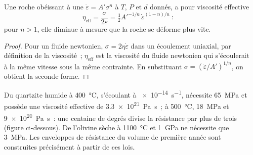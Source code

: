 \begin{proposition}\label{prop:b3:deformation-mechanisms:viscosity}
Une roche obéissant à une  $\dot\varepsilon = A'\sigma^n$ à $T$, $P$ et
$d$ donnés, a pour viscosité effective
\[
  \eta_{\mathrm{eff}} = \frac{\sigma}{2\dot\varepsilon}
  = \tfrac12A'^{-1/n}\,\dot\varepsilon^{(1-n)/n}~:
\]
pour $n > 1$, elle diminue à mesure que la roche se déforme plus vite.
\end{proposition}

\begin{proof}
Pour un fluide newtonien, $\sigma = 2\eta\dot\varepsilon$ dans un écoulement uniaxial, par
définition de la viscosité~; $\eta_{\mathrm{eff}}$ est la viscosité du fluide newtonien
qui s'écoulerait à la même vitesse sous la même contrainte. En substituant
$\sigma = (\dot\varepsilon/A')^{1/n}$, on obtient la seconde forme.
\end{proof}

Du quartzite humide à \qty{400}{\celsius}, s'écoulant à \qty{e-14}{s^{-1}}, nécessite
\qty{65}{MPa} et possède une viscosité effective de \qty{3.3e21}{Pa.s}~; à
\qty{500}{\celsius}, \qty{18}{MPa} et \qty{9e20}{Pa.s}~: une centaine de degrés
divise la résistance par plus de trois (figure ci-dessous). De l'olivine sèche à
\qty{1100}{\celsius} et \qty{1}{GPa} ne nécessite que \qty{3}{MPa}. Les enveloppes de
résistance du volume de première année sont construites précisément à partir de ces lois.

